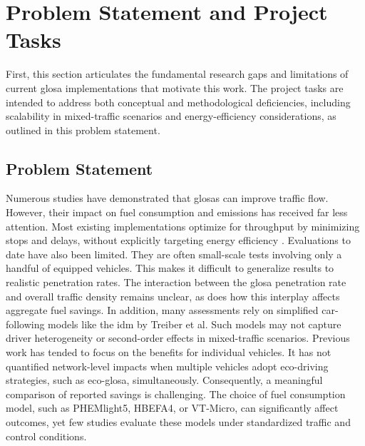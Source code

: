 \section{Problem Statement and Project Tasks}
\label{sec:Problem_Statement_and_Project_Tasks}
First, this section articulates the fundamental research gaps and limitations of current \ac{glosa} implementations that motivate this work. The project tasks are intended to address both conceptual and methodological deficiencies, including scalability in mixed-traffic scenarios and energy-efficiency considerations, as outlined in this problem statement.

\subsection{Problem Statement}
\label{subsec:Problem_Statement}
Numerous studies have demonstrated that \acp{glosa} can improve traffic flow. However, their impact on fuel consumption and emissions has received far less attention. Most existing implementations optimize for throughput by minimizing stops and delays, without explicitly targeting energy efficiency \cite{COPPOLA2022103455}. Evaluations to date have also been limited. They are often small-scale tests involving only a handful of equipped vehicles. This makes it difficult to generalize results to realistic penetration rates. The interaction between the \ac{glosa} penetration rate and overall traffic density remains unclear, as does how this interplay affects aggregate fuel savings. In addition, many assessments rely on simplified car-following models like the \ac{idm} by Treiber et al. \cite{Treiber_2000} Such models may not capture driver heterogeneity or second-order effects in mixed-traffic scenarios. Previous work has tended to focus on the benefits for individual vehicles. It has not quantified network-level impacts when multiple vehicles adopt eco-driving strategies, such as \ac{eco-glosa}, simultaneously. Consequently, a meaningful comparison of reported savings is challenging. The choice of fuel consumption model, such as PHEMlight5, HBEFA4, or VT-Micro, can significantly affect outcomes, yet few studies evaluate these models under standardized traffic and control conditions.

